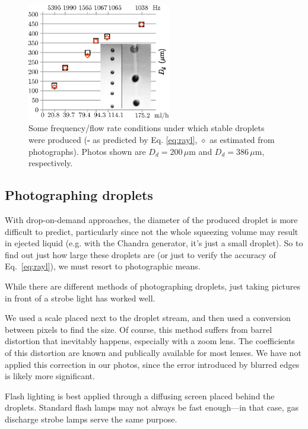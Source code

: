 \documentclass[11.5pt,oneside]{book}
\begin{document}
\begin{figure}[h!]
\centering
\includegraphics[width=0.56\textwidth]{papers/hdg_images/sizes.eps}
\caption{Some frequency/flow rate conditions under which stable droplets were
        produced ($\square$ as predicted by Eq. \ref{eq:rayl},
        {\Large$\diamond$} as estimated
        from photographs). Photos shown are $D_d = 200\,\mu$m and $D_d = 386\,\mu$m,
        respectively.
       \label{fig:dropphoto}}
\end{figure}

\subsection{Photographing droplets}
With drop-on-demand approaches, the diameter of the produced droplet is more
difficult to predict, particularly since not the whole squeezing volume may
result in ejected liquid (e.g. with the Chandra generator, it's just a small
droplet). So to find out just how large these droplets are (or just to verify the accuracy of
Eq.~\eqref{eq:rayl}), we must resort to photographic means.

While there are different methods of photographing droplets, just taking
pictures in front of a strobe light has worked well.

We used a scale placed next to the droplet stream, and then used a conversion
between pixels to find the size. Of course, this method suffers from barrel
distortion that inevitably happens, especially with a zoom lens. The
coefficients of this distortion are known and publically available for most
lenses. We have not applied this correction in our photos, since the error
introduced by blurred edges is likely more significant.

Flash lighting is best applied through a diffusing screen placed behind the
droplets. Standard flash lamps may not always be fast enough---in that case,
gas discharge strobe lamps serve the same purpose.
\end{document}
